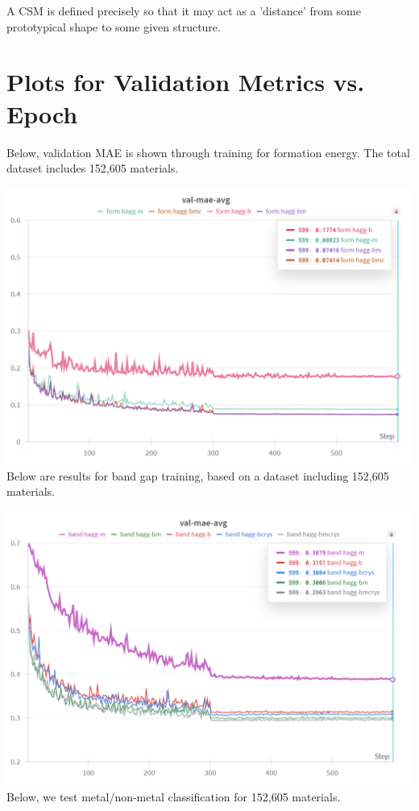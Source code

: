 \documentclass[10pt,a4paper]{article}
\begin{document}
A CSM is defined precisely so that it may act as a 'distance' from some prototypical shape to some given structure.

\section{Plots for Validation Metrics vs. Epoch}
Below, validation MAE is shown through training for formation energy. The total dataset includes 152,605 materials.

\includegraphics[scale=0.84]{formation_energy.png}
Below are results for band gap training, based on a dataset including 152,605 materials.

\includegraphics[scale=0.84]{band_gap.png}
Below, we test metal/non-metal classification for 152,605 materials.
\end{document}
